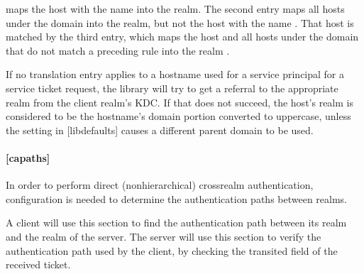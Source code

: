 \documentclass[letterpaper,10pt,english]{sphinxmanual}
\begin{document}
\begin{sphinxVerbatim}[commandchars=\\\{\}]
\PYG{p}{[}\PYG{p}{]}
      
      
      
\end{sphinxVerbatim}

\sphinxAtStartPar
maps the host with the name  into the
 realm.  The second entry maps all hosts under the
domain  into the  realm, but not
the host with the name .  That host is matched
by the third entry, which maps the host  and all hosts
under the domain  that do not match a preceding rule
into the realm .

\sphinxAtStartPar
If no translation entry applies to a hostname used for a service
principal for a service ticket request, the library will try to get a
referral to the appropriate realm from the client realm’s KDC.  If
that does not succeed, the host’s realm is considered to be the
hostname’s domain portion converted to uppercase, unless the
 setting in {[}libdefaults{]} causes a different
parent domain to be used.


\paragraph{{[}capaths{]}}
\label{\detokenize{admin/conf_files/krb5_conf:capaths}}\label{\detokenize{admin/conf_files/krb5_conf:id4}}
\sphinxAtStartPar
In order to perform direct (non\sphinxhyphen{}hierarchical) cross\sphinxhyphen{}realm
authentication, configuration is needed to determine the
authentication paths between realms.

\sphinxAtStartPar
A client will use this section to find the authentication path between
its realm and the realm of the server.  The server will use this
section to verify the authentication path used by the client, by
checking the transited field of the received ticket.
\end{document}
